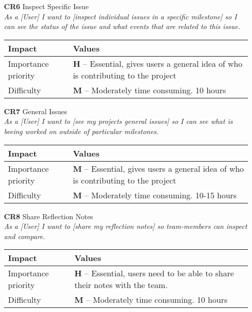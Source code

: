 \begin{itemize}
    \item[\textbf{CR6}] Inspect Specific Issue\\
        \textit{\small{As a [User] I want to [inspect individual issues in a specific milestone] so I can see the status of the issue and what events that are related to this issue.}}

        \begin{tabular}{| l | p{8cm} |}
            \hline
            \rowcolor[gray]{0.8}
            \textbf{Impact} & \textbf{Values} \\
            \hline
            Importance priority & \textbf{H} -- Essential, gives users a general idea of who is contributing to the project\\
            Difficulty & \textbf{M} -- Moderately time consuming. 10 hours\\
            \hline
        \end{tabular}
    \vspace{0.5cm}

    \item[\textbf{CR7}] General Issues\\
        \textit{\small{As a [User] I want to [see my projects general issues] so I can see what is beeing worked on outside of particular milestones.}}

        \begin{tabular}{| l | p{8cm} |}
            \hline
            \rowcolor[gray]{0.8}
            \textbf{Impact} & \textbf{Values} \\
            \hline
            Importance priority & \textbf{M} -- Essential, gives users a general idea of who is contributing to the project\\
            Difficulty & \textbf{M} -- Moderately time consuming. 10-15 hours\\
            \hline
        \end{tabular}
    \vspace{0.5cm}

    \item[\textbf{CR8}] Share Reflection Notes\\
        \textit{\small{As a [User] I want to [share my reflection notes] so team-members can inspect and compare.}}

        \begin{tabular}{| l | p{8cm} |}
            \hline
            \rowcolor[gray]{0.8}
            \textbf{Impact} & \textbf{Values} \\
            \hline
            Importance priority & \textbf{H} -- Essential, users need to be able to share their notes with the team.\\
            Difficulty & \textbf{M} -- Moderately time consuming. 10 hours\\
            \hline
        \end{tabular}
    \vspace{0.5cm}


\end{itemize}
